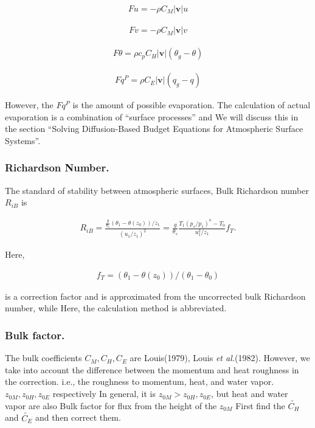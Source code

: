 \begin{eqnarray}
Fu  =  - \rho C_M |\mathbf{v}| u
\end{eqnarray}

\begin{eqnarray}
Fv  =  - \rho C_M |\mathbf{v}| v
\end{eqnarray}

\begin{eqnarray}
F\theta  = \rho c_p C_H |\mathbf{v}| ( \theta_g - \theta )
\end{eqnarray}

\begin{eqnarray}
Fq^P =  \rho C_E |\mathbf{v}| ( q_g - q )
\end{eqnarray}

However, the \(Fq^P\) is the amount of possible evaporation. The
calculation of actual evaporation is a combination of ``surface
processes'' and We will discuss this in the section ``Solving
Diffusion-Based Budget Equations for Atmospheric Surface Systems''.

\hypertarget{richardson-number.}{%
\subsubsection{Richardson Number.}\label{richardson-number.}}

The standard of stability between atmospheric surfaces, Bulk Richardson
number \(R_{iB}\) is

\begin{eqnarray}
R_{iB} = \frac{ \frac{g}{\theta_s} (\theta_1 - \theta(z_0))/z_1 }
              { (u_1/z_1)^2                                  }
       = \frac{g}{\theta_s} 
         \frac{T_1 (p_s/p_1)^\kappa - T_0 }{u_1^2/z_1} f_T .
\end{eqnarray}

Here,

\begin{eqnarray}
f_T = (\theta_1 - \theta(z_0))/(\theta_1 - \theta_0)
\end{eqnarray}

is a correction factor and is approximated from the uncorrected bulk
Richardson number, while Here, the calculation method is abbreviated.

\hypertarget{bulk-factor.}{%
\subsubsection{Bulk factor.}\label{bulk-factor.}}

The bulk coefficients \(C_M,C_H,C_E\) are Louis(1979), Louis {\emph{et
al.}}(1982). However, we take into account the difference between the
momentum and heat roughness in the correction. i.e., the roughness to
momentum, heat, and water vapor. \(z_{0M}, z_{0H}, z_{0E}\) respectively
In general, it is \(z_{0M} > z_{0H}, z_{0E}\), but heat and water vapor
are also Bulk factor for flux from the height of the \(z_{0M}\) First
find the \(\widetilde{C_H}\) and \(\widetilde{C_E}\) and then correct
them.

